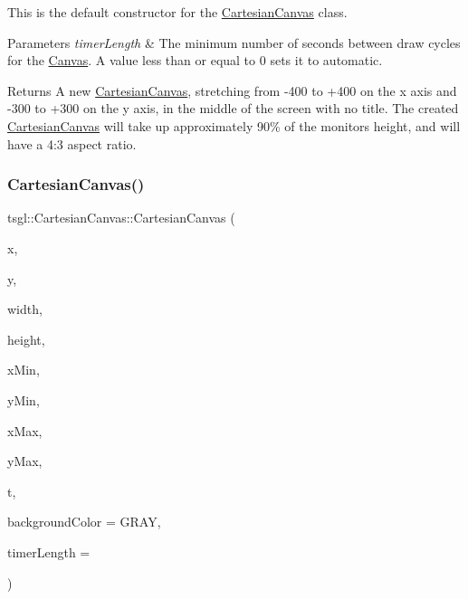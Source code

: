 This is the default constructor for the \hyperlink{classtsgl_1_1_cartesian_canvas}{Cartesian\+Canvas} class. 
\begin{DoxyParams}{Parameters}
{\em timer\+Length} & The minimum number of seconds between draw cycles for the \hyperlink{classtsgl_1_1_canvas}{Canvas}. A value less than or equal to 0 sets it to automatic. \\
\hline
\end{DoxyParams}
\begin{DoxyReturn}{Returns}
A new \hyperlink{classtsgl_1_1_cartesian_canvas}{Cartesian\+Canvas}, stretching from -\/400 to +400 on the x axis and -\/300 to +300 on the y axis, in the middle of the screen with no title. The created \hyperlink{classtsgl_1_1_cartesian_canvas}{Cartesian\+Canvas} will take up approximately 90\% of the monitor\textquotesingle{}s height, and will have a 4\+:3 aspect ratio. 
\end{DoxyReturn}
\mbox{\label{classtsgl_1_1_cartesian_canvas_a15e3b3f68da5d76c2c8644ec8de8ab8f}} 
\subsubsection{\texorpdfstring{Cartesian\+Canvas()}{CartesianCanvas()}\hspace{0.1cm}{\footnotesize\ttfamily [2/2]}}
{\footnotesize\ttfamily tsgl\+::\+Cartesian\+Canvas\+::\+Cartesian\+Canvas (\begin{DoxyParamCaption}\item[{int}]{x,  }\item[{int}]{y,  }\item[{int}]{width,  }\item[{int}]{height,  }\item[{Decimal}]{x\+Min,  }\item[{Decimal}]{y\+Min,  }\item[{Decimal}]{x\+Max,  }\item[{Decimal}]{y\+Max,  }\item[{std\+::string}]{t,  }\item[{\hyperlink{structtsgl_1_1_color_float}{Color\+Float}}]{background\+Color = {\ttfamily GRAY},  }\item[{double}]{timer\+Length = {} }\end{DoxyParamCaption})}



